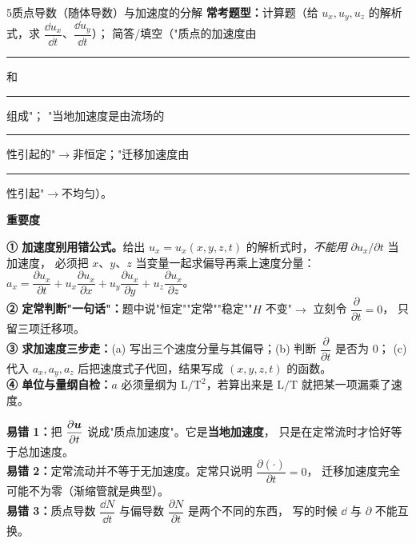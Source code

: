 \begin{kaodian}{5}{质点导数（随体导数）与加速度的分解}
\textbf{常考题型：}计算题（给 $u_x,u_y,u_z$ 的解析式，求 $\dfrac{\dd u_x}{\dd t}$、$\dfrac{\dd u_y}{\dd t}$）；
简答/填空（"质点的加速度由\rule{2cm}{0.4pt}和\rule{2cm}{0.4pt}组成"；
"当地加速度是由流场的\rule{1.5cm}{0.4pt}性引起的"$\to$非恒定；"迁移加速度由\rule{1.5cm}{0.4pt}性引起"$\to$不均匀）。

\textbf{重要度 }\quad{}\quad{}

\begin{banfa}
\textbf{① 加速度别用错公式。}给出 $u_x=u_x(x,y,z,t)$ 的解析式时，\emph{不能用} $\partial u_x/\partial t$ 当加速度，
必须把 $x$、$y$、$z$ 当变量一起求偏导再乘上速度分量：
$a_x=\dfrac{\partial u_x}{\partial t}+u_x\dfrac{\partial u_x}{\partial x}+u_y\dfrac{\partial u_x}{\partial y}+u_z\dfrac{\partial u_x}{\partial z}$。\\
\textbf{② 定常判断"一句话"：}题中说"恒定""定常""稳定""$H$ 不变"$\to$ 立刻令 $\dfrac{\partial}{\partial t}=0$，
只留三项迁移项。\\
\textbf{③ 求加速度三步走：}(a) 写出三个速度分量与其偏导；(b) 判断 $\dfrac{\partial}{\partial t}$ 是否为 0；
(c) 代入 $a_x,a_y,a_z$ 后把速度式子代回，结果写成 $(x,y,z,t)$ 的函数。\\
\textbf{④ 单位与量纲自检：}$a$ 必须量纲为 $\mathrm{L/T^2}$，若算出来是 $\mathrm{L/T}$ 就把某一项漏乘了速度。
\end{banfa}

\begin{yicuo}
\textbf{易错 1：}把 $\dfrac{\partial\bm{u}}{\partial t}$ 说成"质点加速度"。它是\textbf{当地加速度}，
只是在定常流时才恰好等于总加速度。\\
\textbf{易错 2：}定常流动并不等于无加速度。定常只说明 $\dfrac{\partial(\cdot)}{\partial t}=0$，
迁移加速度完全可能不为零（渐缩管就是典型）。\\
\textbf{易错 3：}质点导数 $\dfrac{\dd N}{\dd t}$ 与偏导数 $\dfrac{\partial N}{\partial t}$ 是两个不同的东西，
写的时候 $\dd$ 与 $\partial$ 不能互换。
\end{yicuo}
\end{kaodian}

